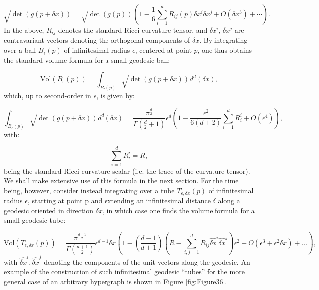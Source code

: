 \documentclass{article}
\begin{document}
\begin{equation}
\sqrt{\det \left( g \left( p + \delta x \right) \right)} = \sqrt{\det \left( g \left( p \right) \right)} \left( 1 - \frac{1}{6} \sum_{i = 1}^{d} R_{i j} \left( p \right) \delta x^i \delta x^j + O \left( \delta x^3 \right) + \cdots \right).
\end{equation}
In the above, ${R_{i j}}$ denotes the standard Ricci curvature tensor, and ${\delta x^i}$, ${\delta x^j}$ are contravariant vectors denoting the orthogonal components of ${\delta x}$. By integrating over a ball ${B_{\epsilon} \left( p \right)}$ of infinitesimal radius ${\epsilon}$, centered at point $p$, one thus obtains the standard volume formula for a small geodesic ball:

\begin{equation}
\mathrm{Vol} \left( B_{\epsilon} \left( p \right) \right) = \int_{B_{\epsilon} \left( p \right)} \sqrt{\det \left( g \left( p + \delta x \right) \right)} d^d \left( \delta x \right),
\end{equation}
which, up to second-order in ${\epsilon}$, is given by:

\begin{equation}
\int_{B_{\epsilon} \left( p \right)} \sqrt{\det \left( g \left( p + \delta x \right) \right)} d^d \left( \delta x \right) = \frac{\pi^{\frac{d}{2}}}{\Gamma \left( \frac{d}{2} + 1 \right)} \epsilon^d \left( 1 - \frac{\epsilon^2}{6 \left( d + 2 \right)} \sum_{i = 1}^{d} R_{i}^{i} + O \left( \epsilon^4 \right) \right),
\end{equation}
with:

\begin{equation}
\sum_{i = 1}^{d} R_{i}^{i} = R,
\end{equation}
being the standard Ricci curvature scalar (i.e. the trace of the curvature tensor). We shall make extensive use of this formula in the next section. For the time being, however, consider instead integrating over a tube ${T_{\epsilon, \delta x} \left( p \right)}$ of infinitesimal radius ${\epsilon}$, starting at point p and extending an infinitesimal distance ${\delta}$ along a geodesic oriented in direction ${\delta x}$, in which case one finds the volume formula for a small geodesic tube:

\begin{equation}
\mathrm{Vol} \left( T_{\epsilon, \delta x} \left( p \right) \right) = \frac{\pi^{\frac{d - 1}{2}}}{\Gamma \left( \frac{d + 1}{2} \right)} \epsilon^{d - 1} \delta x \left( 1 - \left( \frac{d - 1}{d + 1} \right) \left( R - \sum_{i, j = 1}^{d} R_{i j} \hat{\delta x}^i \hat{\delta x}^j \right) \epsilon^2 + O \left( \epsilon^3 + \epsilon^2 \delta x \right) + \dots \right),
\end{equation}
with ${\hat{\delta x}^i, \hat{\delta x}^j}$ denoting the components of the unit vectors along the geodesic. An example of the construction of such infinitesimal geodesic ``tubes'' for the more general case of an arbitrary hypergraph is shown in Figure \ref{fig:Figure36}.
\end{document}
